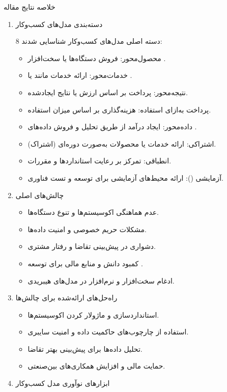 \documentclass[10pt, twocolumn]{article}
\begin{document}
 خلاصه نتایج مقاله  
\begin{enumerate}
\item 
دسته‌بندی مدل‌های کسب‌وکار   


8 دسته اصلی مدل‌های کسب‌وکار  شناسایی شدند:  
\begin{itemize}
\item
 محصول‌محور: فروش دستگاه‌ها یا سخت‌افزار .  
\item خدمات‌محور: ارائه خدمات مانند  یا .  
\item نتیجه‌محور: پرداخت بر اساس ارزش یا نتایج ایجادشده.  
\item پرداخت به‌ازای استفاده: هزینه‌گذاری بر اساس میزان استفاده.  
\item داده‌محور: ایجاد درآمد از طریق تحلیل و فروش داده‌های .  
\item اشتراکی: ارائه خدمات یا محصولات به‌صورت دوره‌ای (اشتراک).  
\item انطباقی: تمرکز بر رعایت استانداردها و مقررات.  
\item آزمایشی (): ارائه محیط‌های آزمایشی برای توسعه و تست فناوری.  
\end{itemize}

\item 
چالش‌های اصلی   
\begin{itemize}
\item عدم هماهنگی اکوسیستم‌ها و تنوع دستگاه‌ها.  
\item مشکلات حریم خصوصی و امنیت داده‌ها.  
\item دشواری در پیش‌بینی تقاضا و رفتار مشتری.  
\item کمبود دانش و منابع مالی برای توسعه .  
\item ادغام سخت‌افزار و نرم‌افزار در مدل‌های هیبریدی.  
\end{itemize}

\item 
راه‌حل‌های ارائه‌شده برای چالش‌ها  
\begin{itemize}
\item استانداردسازی و ماژولار کردن اکوسیستم‌ها.  
\item استفاده از چارچوب‌های حاکمیت داده و امنیت سایبری.  
\item تحلیل داده‌ها برای پیش‌بینی بهتر تقاضا.  
\item حمایت مالی و افزایش همکاری‌های بین‌صنعتی.  
\end{itemize}

\item 
ابزارهای نوآوری مدل کسب‌وکار   


\end{enumerate}
\end{document}
